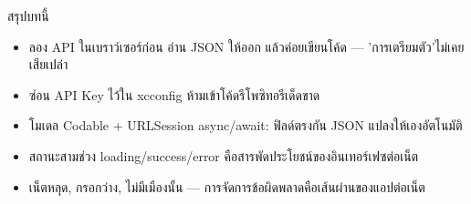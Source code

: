 \begin{tcbsummary}{สรุปบทนี้}
\begin{itemize}
  \item ลอง API ในเบราว์เซอร์ก่อน อ่าน JSON ให้ออก แล้วค่อยเขียนโค้ด — 'การเตรียมตัว'ไม่เคยเสียเปล่า
  \item ซ่อน API Key ไว้ใน xcconfig ห้ามเข้าโค้ดรีโพซิทอรีเด็ดขาด
  \item โมเดล Codable + URLSession async/await: ฟิลด์ตรงกัน JSON แปลงให้เองอัตโนมัติ
  \item สถานะสามช่วง loading/success/error คือสารพัดประโยชน์ของอินเทอร์เฟซต่อเน็ต
  \item เน็ตหลุด, กรอกว่าง, ไม่มีเมืองนั้น — การจัดการข้อผิดพลาดคือเส้นผ่านของแอปต่อเน็ต
\end{itemize}

\end{tcbsummary}
